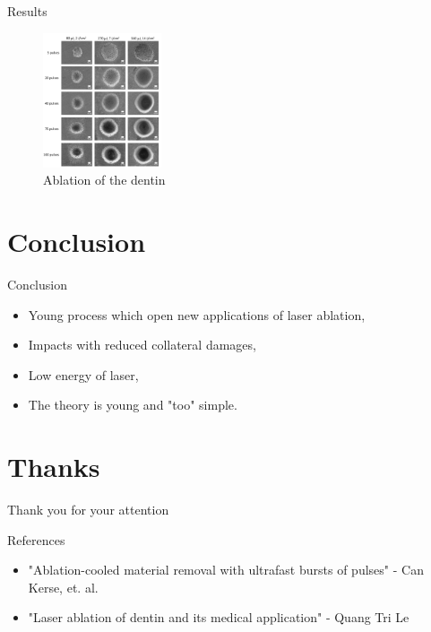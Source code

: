 \documentclass[11pt]{beamer}
\begin{document}
\begin{frame}{Results}

\begin{figure}[H]
\centering
\includegraphics[height=150px]{dentine_impacts.png}
\caption{Ablation of the dentin}
\end{figure}

\end{frame}

\section{Conclusion}

\begin{frame}{Conclusion}
\large
\begin{itemize}
\item Young process which open new applications of laser ablation,
\item Impacts with reduced collateral damages,
\item Low energy of laser,
\item The theory is young and "too" simple.
\end{itemize}
\end{frame}

\section*{Thanks}
\begin{frame}
\center
\huge{Thank you for your attention}
\end{frame}

\begin{frame}{References}

\begin{itemize}
\item "Ablation-cooled material removal with ultrafast bursts of pulses" - Can Kerse, et. al.
\item "Laser ablation of dentin and its medical application" - Quang Tri Le
\end{itemize}

\end{frame}
\end{document}
